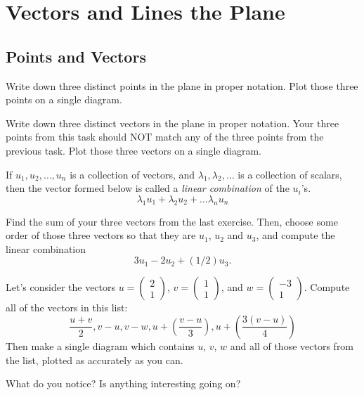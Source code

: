 \documentclass[cahier-main.tex]{subfiles}
\begin{document}
\chapter{Vectors and Lines the Plane}
\label{ch:one}

\section*{Points and Vectors}

\begin{task}
Write down three distinct points in the plane in proper notation. 
Plot those three points on a single diagram.
\end{task}

\begin{task}
Write down three distinct vectors in the plane in proper notation. 
Your three points from this task should NOT match any of the three points from the previous task.
Plot those three vectors on a single diagram.
\end{task}

\begin{definition}
If $u_1, u_2, \ldots, u_n$ is a collection of vectors, and $\lambda_1, \lambda_2, \ldots$ is a collection of scalars, then the vector formed below is called a \emph{linear combination} of the $u_i$'s.
\[
\lambda_1 u_1 + \lambda_2 u_2 + \dots \lambda_n u_n
\]
\end{definition}

\begin{task}
Find the sum of your three vectors from the last exercise. Then, choose some order of those three vectors so that they are $u_1$, $u_2$ and $u_3$, and compute the linear combination
\[
3u_1 - 2u_2 + (1/2)u_3.
\] 
\end{task}

\begin{task}
Let's consider the vectors $u=\left(\begin{smallmatrix} 2 \\1 \end{smallmatrix}\right)$, 
$v=\left(\begin{smallmatrix} 1\\ 1 \end{smallmatrix}\right)$, and $w=\left(\begin{smallmatrix} -3\\ 1 \end{smallmatrix}\right)$.
Compute all of the vectors in this list:
\[
\dfrac{u+v}{2}, v-u, v-w, u + \left(\dfrac{v-u}{3}\right), u + \left(\dfrac{3(v-u)}{4}\right)
\]
Then make a single diagram which contains $u$, $v$, $w$ and all of those vectors from the list, plotted as accurately as you can.

What do you notice? Is anything interesting going on?
\end{task}
\end{document}
